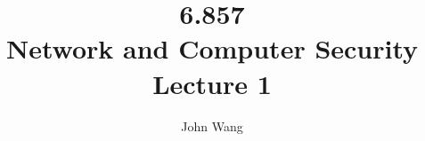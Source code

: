 \documentclass[psamsfonts]{amsart}
\title{6.857 \\
Network and Computer Security \\
Lecture 1}
\author{John Wang}
\newenvironment{def}{{\bfseries Definition:}}
\begin{document}
\maketitle

\section{Introduction to Cryptography}

\begin{def}
\emph{Security} is computing or communicating in the presence of adversaries.
\end{def}

The presence of adversaries make security interesting, because you're working against the cleverness of other people. You are in the worst case scenario. Note that this is different than error correcting codes, for instance, where there is no adversary.

\section{Security Policies}

\begin{def}
\emph{Security policy} describes what is being protected and what activities or events should be protected.
\end{def}

If you don't have a policy, then you don't have security, because nothing is defined yet. Security policy is usually in terms of:
\begin{itemize}
\item Principals (actors or participants).
\item Permissible (or inpermissible) actions or operations.
\item Classes of objects. 
\end{itemize}

\subsection{Examples}

Security Policy: ``Each registered voter may vote at most once.'' Principals are the voters and permissible actions are voting at most once.
Security Policy: ``Only an administrator can modify file $x$.'' 
Security Policy: ``The recipient of an email should be able to authenticate the sender.'' 

\subsection{Types of Policies}
\end{document}
